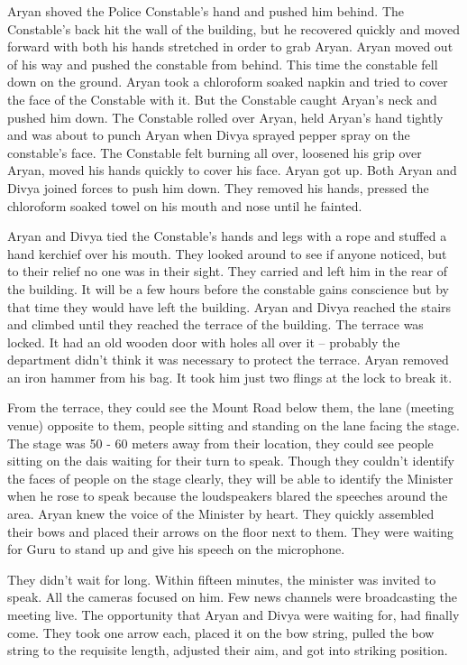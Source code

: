 Aryan shoved the Police Constable's hand and pushed him behind. The Constable's
back hit the wall of the building, but he recovered quickly and moved forward
with both his hands stretched in order to grab Aryan. Aryan moved out of his way
and pushed the constable from behind. This time the constable fell down on the
ground. Aryan took a chloroform soaked napkin and tried to cover the face of the
Constable with it. But the Constable caught Aryan's neck and pushed him down.
The Constable rolled over Aryan, held Aryan's hand tightly and was about to
punch Aryan when Divya sprayed pepper spray on the constable's face. The
Constable felt burning all over, loosened his grip over Aryan, moved his hands
quickly to cover his face. Aryan got up. Both Aryan and Divya joined forces to
push him down. They removed his hands, pressed the chloroform soaked towel on
his mouth and nose until he fainted.

Aryan and Divya tied the Constable's hands and legs with a rope and stuffed a
hand kerchief over his mouth. They looked around to see if anyone noticed, but
to their relief no one was in their sight. They carried and left him in the rear
of the building. It will be a few hours before the constable gains conscience
but by that time they would have left the building. Aryan and Divya reached the
stairs and climbed until they reached the terrace of the building. The terrace
was locked. It had an old wooden door with holes all over it – probably the
department didn't think it was necessary to protect the terrace. Aryan removed
an iron hammer from his bag. It took him just two flings at the lock to break
it.

From the terrace, they could see the Mount Road below them, the lane (meeting
venue) opposite to them, people sitting and standing on the lane facing the
stage. The stage was 50 - 60 meters away from their location, they could see
people sitting on the dais waiting for their turn to speak. Though they couldn't
identify the faces of people on the stage clearly, they will be able to identify
the Minister when he rose to speak because the loudspeakers blared the speeches
around the area. Aryan knew the voice of the Minister by heart. They quickly
assembled their bows and placed their arrows on the floor next to them. They
were waiting for Guru to stand up and give his speech on the microphone.

They didn't wait for long. Within fifteen minutes, the minister was invited to
speak. All the cameras focused on him. Few news channels were broadcasting the
meeting live. The opportunity that Aryan and Divya were waiting for, had finally
come. They took one arrow each, placed it on the bow string, pulled the bow
string to the requisite length, adjusted their aim, and got into striking
position.

